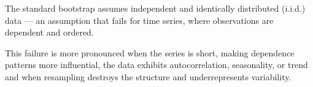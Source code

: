 \documentclass[preprint,11pt,authoryear]{elsarticle}
\begin{document}


The standard bootstrap assumes independent and identically distributed (i.i.d.) data — an assumption that fails for time series, where observations are dependent and ordered.

This failure is more pronounced when the series is short, making dependence patterns more influential, the data exhibits autocorrelation, seasonality, or trend and when resampling destroys the structure and underrepresents variability.
\end{document}
